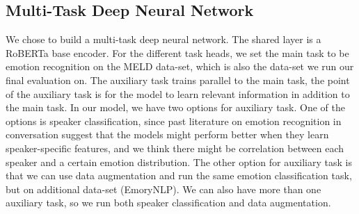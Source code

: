 \documentclass[11pt]{article}
\begin{document}
\subsection{Multi-Task Deep Neural Network}

We chose to build a multi-task deep neural network. The shared layer is a RoBERTa base encoder. For the different task heads, we set the main task to be emotion recognition on the MELD data-set, which is also the data-set we run our final evaluation on. The auxiliary task trains parallel to the main task, the point of the auxiliary task is for the model to learn relevant information in addition to the main task. In our model, we have two options for auxiliary task. One of the options is speaker classification, since past literature on emotion recognition in conversation suggest that the models might perform better when they learn speaker-specific features, and we think there might be correlation between each speaker and a certain emotion distribution. The other option for auxiliary task is that we can use data augmentation and run the same emotion classification task, but on additional data-set (EmoryNLP). We can also have more than one auxiliary task, so we run both speaker classification and data augmentation.
\end{document}
